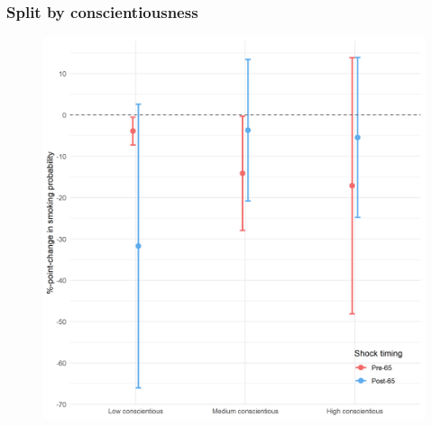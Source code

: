 \documentclass[10pt,compress,xcolor=dvipsnames,aspectratio=169]{beamer}    %
\newcounter{ex}
\newcommand{\1}[1]{\mathrm{1\hspace*{-2.5pt}l}[#1]}	%
\begin{document}
\begin{frame}
\frametitle{Split by conscientiousness}

\begin{figure}[hbtp]
\centering
\includegraphics[height=0.8\textheight]{../../3_output/shock_effects/consc_6070_100_cv.png}
\label{fig:consc}
\end{figure}
\hyperlink{frame:otherX}{}
\end{frame}
\end{document}
